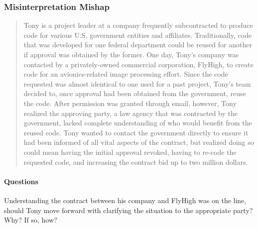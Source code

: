 \subsubsection{Misinterpretation Mishap \cite{3_mm}}
\label{sec:mm}

\begin{quote}
  Tony is a project leader at a company frequently subcontracted to produce code for various U.S. government entities and affiliates. Traditionally, code that was developed for one federal department could be reused for another if approval was obtained by the former. One day, Tony's company was contacted by a privately-owned commercial corporation, FlyHigh, to create code for an avionics-related image processing effort. Since the code requested was almost identical to one used for a past project, Tony's team decided to, once approval had been obtained from the government, reuse the code. After permission was granted through email, however, Tony realized the approving party, a law agency that was contracted by the government, lacked complete understanding of who would benefit from the reused code. Tony wanted to contact the government directly to ensure it had been informed of all vital aspects of the contract, but realized doing so could mean having the initial approval revoked, having to re-code the requested code, and increasing the contract bid up to two million dollars.
\end{quote}

\paragraph{Questions}{
  Understanding the contract between his company and FlyHigh was on the line, should Tony move forward with clarifying the situation to the appropriate party? Why? If so, how?
}

